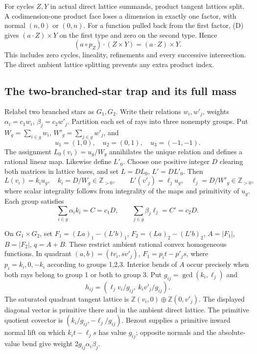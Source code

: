 \documentclass[
  11pt,
]{article}
\begin{document}
For cycles \(Z,Y\) in actual direct lattice summands, product tangent
lattices split. A codimension-one product face loses a dimension in
exactly one factor, with normal \((n,0)\) or \((0,n)\). For a function
pulled back from the first factor, (D) gives \((a\cdot Z)\times Y\) on
the first type and zero on the second type. Hence \[
(a\circ p_Z)\cdot(Z\times Y)=(a\cdot Z)\times Y.
\tag{PR}
\] This includes zero cycles, lineality, refinements and every
successive intersection. The direct ambient lattice splitting prevents
any extra product index.

\subsection{The two-branched-star trap and its full
mass}\label{the-two-branched-star-trap-and-its-full-mass}

Relabel two branched stars as \(G_1,G_2\). Write their relations
\(w_i,w'_j\), weights \(\alpha_i=c_1w_i\), \(\beta_j=c_2w'_j\).
Partition each set of rays into three nonempty groups. Put
\(W_g=\sum_{i\in g}w_i\), \(W'_g=\sum_{j\in g}w'_j\), and \[
u_1=(1,0),\quad u_2=(0,1),\quad u_3=(-1,-1).
\] The assignment \(L_0(v_i)=u_g/W_g\) annihilates the unique relation
and defines a rational linear map. Likewise define \(L'_0\). Choose one
positive integer \(D\) clearing both matrices in lattice bases, and set
\(L=DL_0\), \(L'=DL'_0\). Then \[
L(v_i)=k_iu_g,\quad k_i=D/W_g\in\mathbb Z_{>0},\qquad
L'(v'_j)=\ell_ju_g,\quad\ell_j=D/W'_g\in\mathbb Z_{>0},
\] where scalar integrality follows from integrality of the maps and
primitivity of \(u_g\). Each group satisfies \[
\sum_{i\in g}\alpha_ik_i=C=c_1D,\qquad
\sum_{j\in g}\beta_j\ell_j=C'=c_2D.
\tag{G1}
\]

On \(G_1\times G_2\), set \(F_1=(La)_1-(L'b)_1\),
\(F_2=(La)_2-(L'b)_2\), \(A=|F_1|\), \(B=|F_2|\), \(q=A+B\). These
restrict ambient rational convex homogeneous functions. In quadrant
\((a,b)=(tv_i,sv'_j)\), \(F_1=p_it-p'_js\), where \(p_i=k_i,0,-k_i\)
according to groups 1,2,3. Interior bends of \(A\) occur precisely when
both rays belong to group 1 or both to group 3. Put
\(g_{ij}=\gcd(k_i,\ell_j)\) and \[
h_{ij}=(\ell_jv_i/g_{ij},\ k_iv'_j/g_{ij}).
\] The saturated quadrant tangent lattice is
\(\mathbb Z(v_i,0)\oplus\mathbb Z(0,v'_j)\). The displayed diagonal
vector is primitive there and in the ambient direct lattice. The
primitive quotient covector is \((k_i/g_{ij},-\ell_j/g_{ij})\). Bezout
supplies a primitive inward normal lift on which \(k_it-\ell_js\) has
value \(g_{ij}\); opposite normals and the absolute-value bend give
weight \(2g_{ij}\alpha_i\beta_j\).
\end{document}
